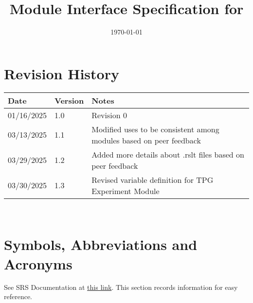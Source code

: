 \documentclass[12pt, titlepage]{article}
\begin{document}
\title{Module Interface Specification for \progname{}}

\author{\authname}

\date{\today}

\maketitle


\section{Revision History}

\begin{tabularx}{\textwidth}{p{3cm}p{2cm}X}
\toprule {\bf Date} & {\bf Version} & {\bf Notes}\\
\midrule
01/16/2025 & 1.0 & Revision 0\\
03/13/2025 & 1.1 & Modified uses to be consistent among modules based on peer feedback\\
03/29/2025 & 1.2 & Added more details about .rslt files based on peer feedback\\
03/30/2025 & 1.3 & Revised variable definition for TPG Experiment Module\\
\bottomrule
\end{tabularx}

~\newpage

\section{Symbols, Abbreviations and Acronyms}

See SRS Documentation at \href{https://github.com/TPGEngine/tpg/blob/main/docs/SRS/SRS.pdf}{this link}. This section records information for easy reference. \\
\end{document}
